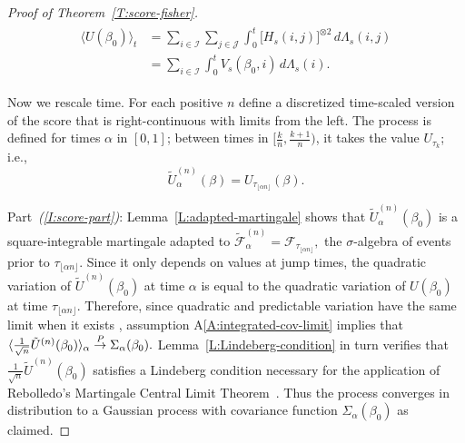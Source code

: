 \documentclass[aoas,preprint]{imsart}
\begin{document}
\begin{proof}[Proof of Theorem~\ref{T:score-fisher}]
\begin{align}
\begin{split}\label{E:score-compensator}
    \big\langle U(\beta_0) \big\rangle_t
        &=
            \sum_{i \in \mathcal{I}}
            \sum_{j \in \mathcal{J}}
            \int_0^t
                \big[ H_s(i,j) \big]^{\otimes 2} \,
                d\Lambda_s(i,j) \\
        &=
            \sum_{i \in \mathcal{I}}
            \int_0^t
                V_s(\beta_0, i) \,
                d\Lambda_s(i).
\end{split}%
\end{align}

Now we rescale time.  For each positive $n$ define a discretized time-scaled version of the score that is right-continuous with limits from the left.  The process is defined for times $\alpha$ in $[0,1]$; between times in $[\tfrac{k}{n}, \tfrac{k+1}{n})$, it takes the value $U_{\tau_k}$; i.e.,
\[
    \tilde U_{\alpha}^{(n)}(\beta)
        = U_{\tau_{\lfloor \alpha n \rfloor}}(\beta).
\]

Part~\textit{(\ref{I:score-part})}: 
Lemma~\ref{L:adapted-martingale} shows that $\tilde U_\alpha^{(n)}(\beta_0)$ is a square-integrable martingale
adapted to
\(
    \mathcal{\tilde F}^{(n)}_\alpha
        =
        \mathcal{F}_{\tau_{\lfloor \alpha n \rfloor}},
\)
the $\sigma$-algebra of events prior to
$\tau_{\lfloor \alpha n \rfloor}$.
Since it only depends on values at jump times, the
quadratic variation of $\tilde U^{(n)}(\beta_0)$ at time $\alpha$ is
equal to the quadratic variation of $U(\beta_0)$ at time
$\tau_{\lfloor \alpha n \rfloor}$.  Therefore, since quadratic and predictable
variation have the same limit when it exists
\cite[Prop.~1]{rebolledo1980central}, assumption A\ref{A:integrated-cov-limit}
implies that
\(
    \langle \frac{1}{\sqrt{n}} \tilde U^{(n)}(\beta_0) \rangle_\alpha
        \overset{\mathit{P}}{\to}
            \Sigma_\alpha(\beta_0).
\)
Lemma~\ref{L:Lindeberg-condition} in turn verifies that $\frac{1}{\sqrt{n}} \tilde U^{(n)}(\beta_0)$ satisfies a Lindeberg condition necessary for the application of Rebolledo's Martingale Central Limit Theorem~\cite{rebolledo1980central}.  Thus the process converges in distribution to a Gaussian process with covariance function $\Sigma_\alpha(\beta_0)$ as claimed.


\end{proof}
\end{document}
